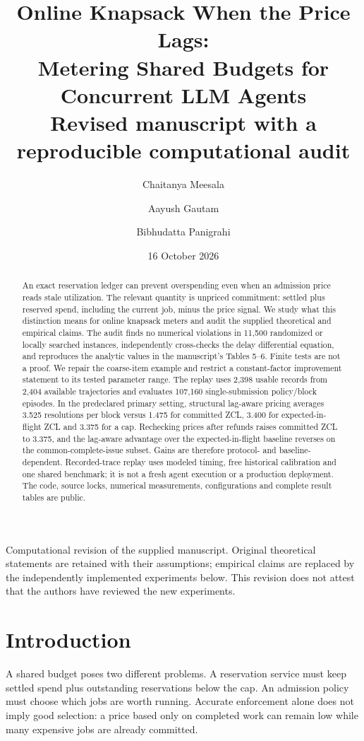 \documentclass[11pt]{article}
\title{Online Knapsack When the Price Lags:\\Metering Shared Budgets for Concurrent LLM Agents\\[0.6em]\large Revised manuscript with a reproducible computational audit}
\author{Chaitanya Meesala \and Aayush Gautam \and Bibhudatta Panigrahi}
\date{16 October 2026}
\begin{document}
\maketitle
\begin{center}\small Computational revision of the supplied manuscript. Original theoretical statements are retained with their assumptions; empirical claims are replaced by the independently implemented experiments below. This revision does not attest that the authors have reviewed the new experiments.\end{center}
\begin{abstract}
An exact reservation ledger can prevent overspending even when an admission price reads stale utilization. The relevant quantity is unpriced commitment: settled plus reserved spend, including the current job, minus the price signal. We study what this distinction means for online knapsack meters and audit the supplied theoretical and empirical claims. The audit finds no numerical violations in 11,500 randomized or locally searched instances, independently cross-checks the delay differential equation, and reproduces the analytic values in the manuscript's Tables 5--6. Finite tests are not a proof. We repair the coarse-item example and restrict a constant-factor improvement statement to its tested parameter range. The replay uses 2,398 usable records from 2,404 available trajectories and evaluates 107,160 single-submission policy/block episodes. In the predeclared primary setting, structural lag-aware pricing averages 3.525 resolutions per block versus 1.475 for committed ZCL, 3.400 for expected-in-flight ZCL and 3.375 for a cap. Rechecking prices after refunds raises committed ZCL to 3.375, and the lag-aware advantage over the expected-in-flight baseline reverses on the common-complete-issue subset. Gains are therefore protocol- and baseline-dependent. Recorded-trace replay uses modeled timing, free historical calibration and one shared benchmark; it is not a fresh agent execution or a production deployment. The code, source locks, numerical measurements, configurations and complete result tables are public.
\end{abstract}

\section{Introduction}
A shared budget poses two different problems. A reservation service must keep settled spend plus outstanding reservations below the cap. An admission policy must choose which jobs are worth running. Accurate enforcement alone does not imply good selection: a price based only on completed work can remain low while many expensive jobs are already committed.
\end{document}
